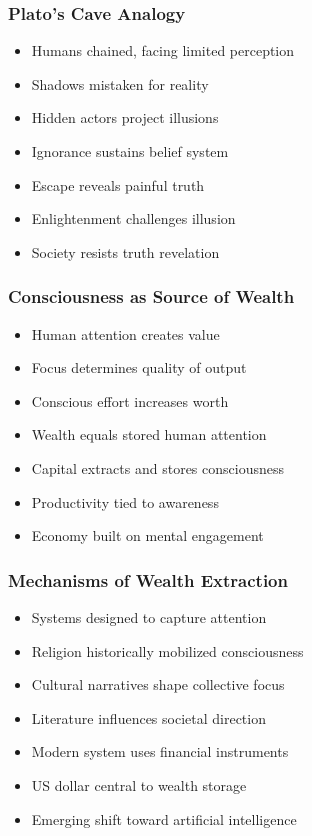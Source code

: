 \begin{frame}[fragile]\frametitle{Plato’s Cave Analogy}
\begin{itemize}
\item Humans chained, facing limited perception
\item Shadows mistaken for reality
\item Hidden actors project illusions
\item Ignorance sustains belief system
\item Escape reveals painful truth
\item Enlightenment challenges illusion
\item Society resists truth revelation
\end{itemize}
\end{frame}

\begin{frame}[fragile]\frametitle{Consciousness as Source of Wealth}
\begin{itemize}
\item Human attention creates value
\item Focus determines quality of output
\item Conscious effort increases worth
\item Wealth equals stored human attention
\item Capital extracts and stores consciousness
\item Productivity tied to awareness
\item Economy built on mental engagement
\end{itemize}
\end{frame}

\begin{frame}[fragile]\frametitle{Mechanisms of Wealth Extraction}
\begin{itemize}
\item Systems designed to capture attention
\item Religion historically mobilized consciousness
\item Cultural narratives shape collective focus
\item Literature influences societal direction
\item Modern system uses financial instruments
\item US dollar central to wealth storage
\item Emerging shift toward artificial intelligence
\end{itemize}
\end{frame}

